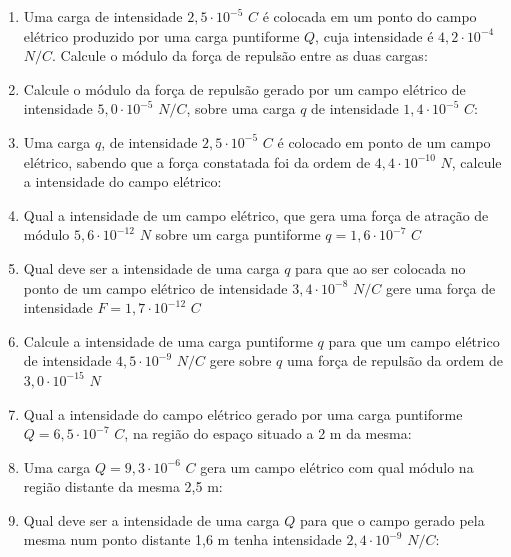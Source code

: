\documentclass[12pt,a4paper]{book}
\begin{document}
	\begin{enumerate}
		
	
	\item Uma carga de intensidade $2,5 \cdot 10^{-5}$ $C$ é colocada em um ponto do campo elétrico produzido por uma carga puntiforme $Q$, cuja intensidade é $4,2 \cdot 10^{-4}$ $N/C$. Calcule o módulo da força de repulsão entre as duas cargas:
		
	\item Calcule o módulo da força de repulsão gerado por um campo elétrico de intensidade $5,0 \cdot 10^{-5}$ $N/C$, sobre uma carga $q$ de intensidade $1,4 \cdot 10^{-5}$ $C$:
		
	\item Uma carga $q$, de intensidade $2,5 \cdot 10^{-5}$ $C$ é colocado em ponto de um campo elétrico, sabendo que a força constatada foi da ordem de $4,4 \cdot 10^{-10}$ $N$, calcule a intensidade do campo elétrico:
	
	\item Qual a intensidade de um campo elétrico, que gera uma força de atração de módulo  $5,6 \cdot 10^{-12}$ $N$ sobre um carga puntiforme  $q = 1,6 \cdot 10^{-7}$ $C$
	
	\item Qual deve ser a intensidade de uma carga $q$ para que ao ser colocada no ponto de um campo elétrico de intensidade $3,4 \cdot 10^{-8}$ $N/C$ gere uma força de intensidade $F = 1,7 \cdot 10^{-12}$ $C$
	
	\item Calcule a intensidade de uma carga puntiforme $q$ para que um campo elétrico de intensidade $4,5 \cdot 10^{-9}$ $N/C$ gere sobre $q$ uma força de repulsão da ordem de $3,0 \cdot 10^{-15}$ $N$ 
	
	\item Qual a intensidade do campo elétrico gerado por uma carga puntiforme $Q = 6,5 \cdot 10^{-7}$ $C$, na região do espaço situado a 2 m da mesma:
	
	\item Uma carga $Q = 9,3 \cdot 10^{-6}$ $C$ gera um campo elétrico com qual módulo na região distante da mesma 2,5 m:
	
	\item Qual deve ser a intensidade de uma carga $Q$ para que o campo gerado pela mesma num ponto distante 1,6 m tenha intensidade $2,4 \cdot 10^{-9}$ $N/C$:
	

\end{enumerate}
\end{document}
